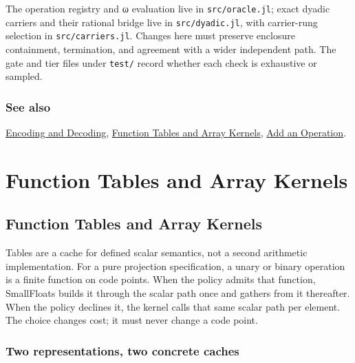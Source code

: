 The operation registry and ω evaluation live in \texttt{src/oracle.jl}; exact dyadic carriers and their rational bridge live in \texttt{src/dyadic.jl}, with carrier-rung selection in \texttt{src/carriers.jl}. Changes here must preserve enclosure containment, termination, and agreement with a wider independent path. The gate and tier files under \texttt{test/} record whether each check is exhaustive or sampled.



\subsection{See also}



\label{292862844209942199-dup18}{}


\href{internals\_\allowbreak{}encoding\_\allowbreak{}decoding.md}{Encoding and Decoding}, \href{internals\_\allowbreak{}tables.md}{Function Tables and Array Kernels}, \href{internals\_\allowbreak{}add\_\allowbreak{}operation.md}{Add an Operation}.



\chapter{Function Tables and Array Kernels}


\section{Function Tables and Array Kernels}



\label{5188350995609298052}{}


Tables are a cache for defined scalar semantics, not a second arithmetic implementation. For a pure projection specification, a unary or binary operation is a finite function on code points. When the policy admits that function, SmallFloats builds it through the scalar path once and gathers from it thereafter. When the policy declines it, the kernel calls that same scalar path per element. The choice changes cost; it must never change a code point.



\subsection{Two representations, two concrete caches}



